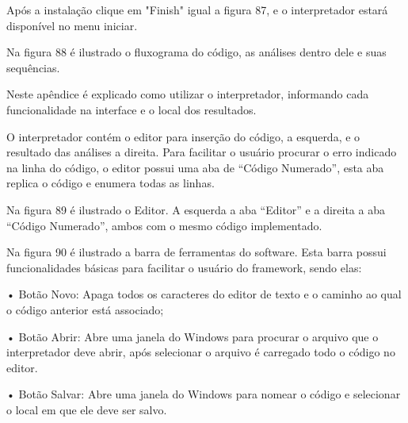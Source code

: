 \documentclass[12pt,oneside,a4paper,chapter=TITLE,section=TITLE,sumario=tradicional]{abntex2}
\begin{document}
Após a instalação clique em "Finish" igual a figura 87, e o interpretador estará disponível no menu iniciar.

\begin{figure}[H]
\end{figure}


Na figura 88 é ilustrado o fluxograma do código, as análises dentro dele e suas sequências.

\begin{figure}[H]
\end{figure}


Neste apêndice é explicado como utilizar o interpretador, informando cada funcionalidade na interface e o local dos resultados.

O interpretador contém o editor para inserção do código, a esquerda, e o resultado das análises a direita. Para facilitar o usuário procurar o erro indicado na linha do código, o editor possui uma aba de “Código Numerado”, esta aba replica o código e enumera todas as linhas. 

Na figura 89 é ilustrado o Editor. A esquerda a aba “Editor” e a direita a aba “Código Numerado”, ambos com o mesmo código implementado.

\begin{figure}[H]
\end{figure}

Na figura 90 é ilustrado a barra de ferramentas do software. Esta barra possui funcionalidades básicas para facilitar o usuário do framework, sendo elas:

•	Botão Novo: Apaga todos os caracteres do editor de texto e o caminho ao qual o código anterior está associado;

•	Botão Abrir: Abre uma janela do Windows para procurar o arquivo que o interpretador deve abrir, após selecionar o arquivo é carregado todo o código no editor.

•	Botão Salvar: Abre uma janela do Windows para nomear o código e selecionar o local em que ele deve ser salvo.
\end{document}
